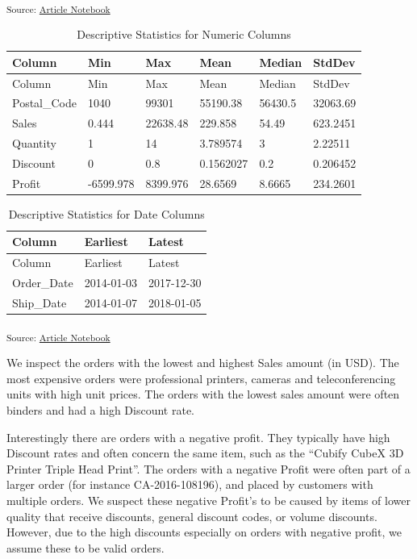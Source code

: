 \documentclass[
  letterpaper,
  DIV=11,
  numbers=noendperiod,
  oneside]{scrartcl}
\begin{document}
\textsubscript{Source:
\href{https://SJbrou.github.io/Supply_Chain_Data_Analysis/index.qmd.html}{Article
Notebook}}

\begin{longtable}[]{@{}llllll@{}}
\caption{Descriptive Statistics for Numeric Columns}\tabularnewline
\toprule\noalign{}
Column & Min & Max & Mean & Median & StdDev \\
\midrule\noalign{}
\endfirsthead
\toprule\noalign{}
Column & Min & Max & Mean & Median & StdDev \\
\midrule\noalign{}
\endhead
\bottomrule\noalign{}
\endlastfoot
Postal\_Code & 1040 & 99301 & 55190.38 & 56430.5 & 32063.69 \\
Sales & 0.444 & 22638.48 & 229.858 & 54.49 & 623.2451 \\
Quantity & 1 & 14 & 3.789574 & 3 & 2.22511 \\
Discount & 0 & 0.8 & 0.1562027 & 0.2 & 0.206452 \\
Profit & -6599.978 & 8399.976 & 28.6569 & 8.6665 & 234.2601 \\
\end{longtable}

\begin{longtable}[]{@{}lll@{}}
\caption{Descriptive Statistics for Date Columns}\tabularnewline
\toprule\noalign{}
Column & Earliest & Latest \\
\midrule\noalign{}
\endfirsthead
\toprule\noalign{}
Column & Earliest & Latest \\
\midrule\noalign{}
\endhead
\bottomrule\noalign{}
\endlastfoot
Order\_Date & 2014-01-03 & 2017-12-30 \\
Ship\_Date & 2014-01-07 & 2018-01-05 \\
\end{longtable}

\textsubscript{Source:
\href{https://SJbrou.github.io/Supply_Chain_Data_Analysis/index.qmd.html}{Article
Notebook}}

We inspect the orders with the lowest and highest Sales amount (in USD).
The most expensive orders were professional printers, cameras and
teleconferencing units with high unit prices. The orders with the lowest
sales amount were often binders and had a high Discount rate.

Interestingly there are orders with a negative profit. They typically
have high Discount rates and often concern the same item, such as the
``Cubify CubeX 3D Printer Triple Head Print''. The orders with a
negative Profit were often part of a larger order (for instance
CA-2016-108196), and placed by customers with multiple orders. We
suspect these negative Profit's to be caused by items of lower quality
that receive discounts, general discount codes, or volume discounts.
However, due to the high discounts especially on orders with negative
profit, we assume these to be valid orders.
\end{document}
